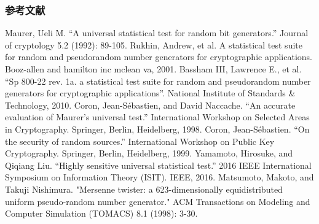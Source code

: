 \documentclass[dvipdfmx,11pt]{beamer}
\begin{document}
\begin{frame}[c]\frametitle{参考文献}
    \scriptsize{%
    \begin{thebibliography}{9}
    \setlength{\itemsep}{0.25\baselineskip}
    \beamertemplatetextbibitems
     Maurer, Ueli M. ``A universal statistical test for random bit generators.'' Journal of cryptology 5.2 (1992): 89-105.
     Rukhin, Andrew, et al. A statistical test suite for random and pseudorandom number generators for cryptographic applications. Booz-allen and hamilton inc mclean va, 2001.
     Bassham III, Lawrence E., et al. ``Sp 800-22 rev. 1a. a statistical test suite for random and pseudorandom number generators for cryptographic applications''. National Institute of Standards \& Technology, 2010.
     Coron, Jean-S\'{e}bastien, and David Naccache. ``An accurate evaluation of Maurer’s universal test.'' International Workshop on Selected Areas in Cryptography. Springer, Berlin, Heidelberg, 1998.
     Coron, Jean-S\'{e}bastien. ``On the security of random sources.'' International Workshop on Public Key Cryptography. Springer, Berlin, Heidelberg, 1999.
     Yamamoto, Hirosuke, and Qiqiang Liu. ``Highly sensitive universal statistical test.'' 2016 IEEE International Symposium on Information Theory (ISIT). IEEE, 2016.
     Matsumoto, Makoto, and Takuji Nishimura. "Mersenne twister: a 623-dimensionally equidistributed uniform pseudo-random number generator." ACM Transactions on Modeling and Computer Simulation (TOMACS) 8.1 (1998): 3-30.
    \end{thebibliography}
    }
\end{frame}
\end{document}
